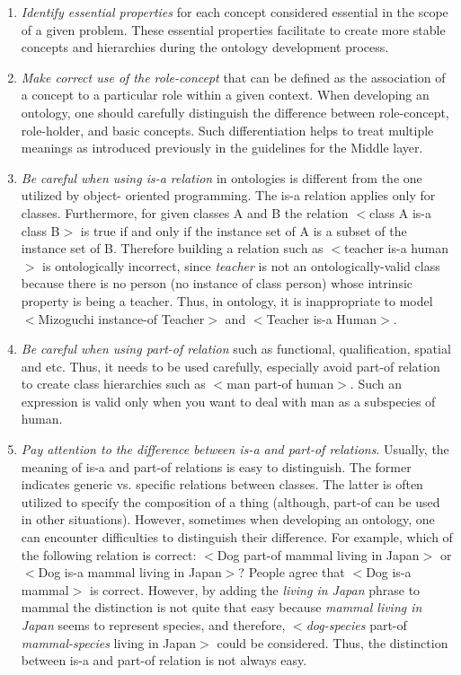 \begin{enumerate}
\item \emph{Identify essential properties} for each concept considered essential in the scope of a given problem. These essential properties facilitate to create more stable concepts and hierarchies during the ontology development process.

\item \emph{Make correct use of the role-concept} that can be defined as the association of a concept to a particular role within a given context. When developing an ontology, one should carefully distinguish the difference between role-concept, role-holder, and basic concepts. Such differentiation helps to treat multiple meanings as introduced previously in the guidelines for the Middle layer.

\item \emph{Be careful when using is-a relation} in ontologies is different from the one utilized by object- oriented programming. The is-a relation applies only for classes. Furthermore, for given classes A and B the relation $<$class A is-a class B$>$ is true if and only if the instance set of A is a subset of the instance set of B. Therefore building a relation such as $<$teacher is-a human$>$ is ontologically incorrect, since \emph{teacher} is not an ontologically-valid class because there is no person (no instance of class person) whose intrinsic property is being a teacher. Thus, in ontology, it is inappropriate to model $<$Mizoguchi instance-of Teacher$>$ and $<$Teacher is-a Human$>$.%

\item \emph{Be careful when using part-of relation} such as functional, qualification, spatial and etc. Thus, it needs to be used carefully, especially avoid part-of relation to create class hierarchies such as $<$man part-of human$>$. Such an expression is valid only when you want to deal with man as a subspecies of human.

\item \emph{Pay attention to the difference between is-a and part-of relations}. Usually, the meaning of is-a and part-of relations is easy to distinguish. The former indicates generic vs. specific relations between classes. The latter is often utilized to specify the composition of a thing (although, part-of can be used in other situations). However, sometimes when developing an ontology, one can encounter difficulties to distinguish their difference. For example, which of the following relation is correct: $<$Dog part-of mammal living in Japan$>$ or $<$Dog is-a mammal living in Japan$>$? People agree that $<$Dog is-a mammal$>$ is correct. However, by adding the \emph{living in Japan} phrase to mammal the distinction is not quite that easy because \emph{mammal living in Japan} seems to represent species, and therefore, $<$\emph{dog-species} part-of  \emph{mammal-species} living in Japan$>$ could be considered. Thus, the distinction between is-a and part-of relation is not always easy.


\end{enumerate}
